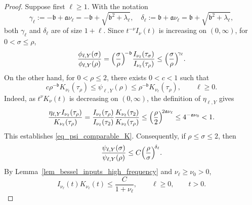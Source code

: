 \documentclass[12pt]{amsart}
\begin{document}
\begin{proof}
Suppose first $\ell\ge 1$. With the notation
\begin{equation*}
\gamma_\ell:= -\mathfrak b+\mathfrak a\nu_\ell = -\mathfrak b+\sqrt{\mathfrak b^2+\lambda_\ell},\quad \delta_\ell := \mathfrak b+\mathfrak a\nu_\ell = \mathfrak b+\sqrt{\mathfrak b^2+\lambda_\ell},
\end{equation*}
both $\gamma_\ell$ and $\delta_\ell$ are of size $1+\ell$. Since $t^{-\nu}I_\nu(t)$ is increasing on $(0,\infty)$, for
$0<\sigma\leq\rho$,
\begin{equation}\label{eq_phi_ratio}
    \frac{\phi_{\ell,Y}(\sigma)}{\phi_{\ell,Y}(\rho)}
    =
    \Bigl(\frac{\sigma}{\rho}\Bigr)^{\!-\mathfrak b}
    \frac{I_{\nu_\ell}(\tau_\sigma)}{I_{\nu_\ell}(\tau_\rho)}
    \le
    \Bigl(\frac{\sigma}{\rho}\Bigr)^{\!\gamma_\ell}.
\end{equation}
On the other hand, for $0<\rho\le 2$, there exists $0<c<1$ such that
\begin{equation}\label{eq_psi_comparable_K}
    c\rho^{-\mathfrak b}K_{\nu_\ell}(\tau_\rho)
    \le
    \psi_{\ell,Y}(\rho)
    \le
    \rho^{-\mathfrak b}K_{\nu_\ell}(\tau_\rho),\qquad \ell \ge 0.
\end{equation}
Indeed, as $t^\nu K_\nu(t)$ is decreasing on $(0,\infty)$, the definition of $\eta_{\ell,Y}$ gives
\begin{equation*}
\frac{\eta_{\ell,Y}I_{\nu_\ell}(\tau_\rho)}{K_{\nu_\ell}(\tau_\rho)} =
\frac{I_{\nu_\ell}(\tau_\rho)}{I_{\nu_\ell}(\tau_2)}
\frac{K_{\nu_\ell}(\tau_2)}{K_{\nu_\ell}(\tau_\rho)}\le
\Bigl(\frac{\rho}{2}\Bigr)^{\!2\mathfrak a\nu_\ell}\le
4^{-\mathfrak a\nu_0} < 1.
\end{equation*}
This establishes \eqref{eq_psi_comparable_K}. Consequently, if $\rho\le \sigma \le 2$, then
\begin{equation}\label{eq_psi_ratio}
    \frac{\psi_{\ell,Y}(\sigma)}{\psi_{\ell,Y}(\rho)}
    \leq
    C
    \Bigl(\frac{\rho}{\sigma}\Bigr)^{\!\delta_\ell}.
\end{equation}
By Lemma~\ref{lem_bessel_inputs_high_frequency} and $\nu_\ell \ge \nu_0 >0$,
\begin{equation}\label{eq_IK_product_bound}
I_{\nu_\ell} (t) K_{\nu_\ell} (t) \le \frac{C}{1+\nu_\ell}, \qquad \ell \ge 0, \qquad t>0.
\end{equation}

\end{proof}
\end{document}
